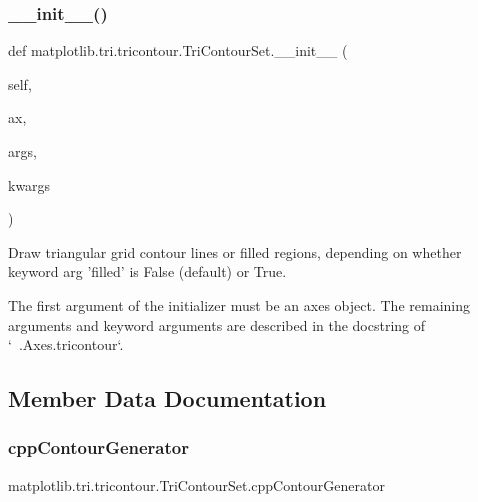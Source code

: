 \subsubsection{\texorpdfstring{\+\_\+\+\_\+init\+\_\+\+\_\+()}{\_\_init\_\_()}}
{\footnotesize\ttfamily def matplotlib.\+tri.\+tricontour.\+Tri\+Contour\+Set.\+\_\+\+\_\+init\+\_\+\+\_\+ (\begin{DoxyParamCaption}\item[{}]{self,  }\item[{}]{ax,  }\item[{}]{args,  }\item[{}]{kwargs }\end{DoxyParamCaption})}

\begin{DoxyVerb}Draw triangular grid contour lines or filled regions,
depending on whether keyword arg 'filled' is False
(default) or True.

The first argument of the initializer must be an axes
object.  The remaining arguments and keyword arguments
are described in the docstring of `~.Axes.tricontour`.
\end{DoxyVerb}
 

\subsection{Member Data Documentation}
\mbox{\label{classmatplotlib_1_1tri_1_1tricontour_1_1TriContourSet_ac7276a16e6f34ebfb5ed63aacec64644}} 
\subsubsection{\texorpdfstring{cpp\+Contour\+Generator}{cppContourGenerator}}
{\footnotesize\ttfamily matplotlib.\+tri.\+tricontour.\+Tri\+Contour\+Set.\+cpp\+Contour\+Generator}

\mbox{\label{classmatplotlib_1_1tri_1_1tricontour_1_1TriContourSet_aaf2cfa8111922a91fbd9c8879c038490}} 
